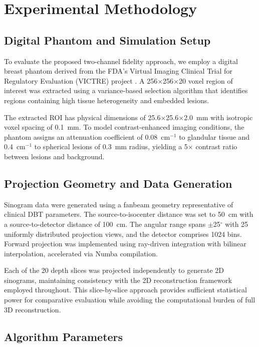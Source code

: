 \documentclass[journal, a4paper]{IEEEtran}
\begin{document}
\section{Experimental Methodology}

\subsection{Digital Phantom and Simulation Setup}

To evaluate the proposed two-channel fidelity approach, we employ a digital breast phantom derived from the FDA's Virtual Imaging Clinical Trial for Regulatory Evaluation (VICTRE) project \cite{badano2018evaluation}. A 256$\times$256$\times$20 voxel region of interest was extracted using a variance-based selection algorithm that identifies regions containing high tissue heterogeneity and embedded lesions.

The extracted ROI has physical dimensions of 25.6$\times$25.6$\times$2.0~mm with isotropic voxel spacing of 0.1~mm. To model contrast-enhanced imaging conditions, the phantom assigns an attenuation coefficient of 0.08~cm$^{-1}$ to glandular tissue and 0.4~cm$^{-1}$ to spherical lesions of 0.3~mm radius, yielding a 5$\times$ contrast ratio between lesions and background.

\subsection{Projection Geometry and Data Generation}

Sinogram data were generated using a fanbeam geometry representative of clinical DBT parameters. The source-to-isocenter distance was set to 50~cm with a source-to-detector distance of 100~cm. The angular range spans $\pm$25$^\circ$ with 25 uniformly distributed projection views, and the detector comprises 1024 bins. Forward projection was implemented using ray-driven integration with bilinear interpolation, accelerated via Numba compilation.

Each of the 20 depth slices was projected independently to generate 2D sinograms, maintaining consistency with the 2D reconstruction framework employed throughout. This slice-by-slice approach provides sufficient statistical power for comparative evaluation while avoiding the computational burden of full 3D reconstruction.

\subsection{Algorithm Parameters}
\end{document}
